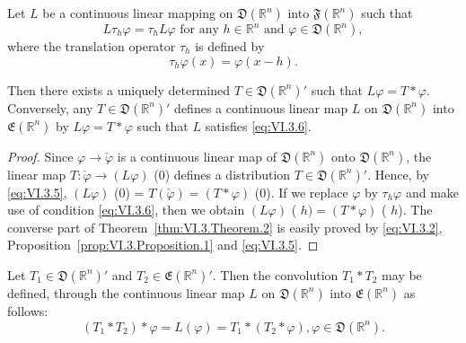 \begin{theorem}\label{thm:VI.3.Theorem.2} Let $L$ be a continuous linear mapping on $\mathfrak{D}(\mathbb{R}^{n})$ into $\mathfrak{F}(\mathbb{R}^{n})$ such that 
\begin{equation}\label{eq:VI.3.6}
L \tau_{h} \varphi = \tau_{h} L \varphi \text{ for any } h \in \mathbb{R}^{n} \text{ and } \varphi \in \mathfrak {D} (\mathbb{R}^{n}),
\end{equation}
where the translation operator $\tau_{h}$ is defined by 
\begin{equation}\label{eq:VI.3.7}
\tau_{h} \varphi (x) = \varphi (x - h).
\end{equation}
\end{theorem}

Then there exists a uniquely determined $T \in \mathfrak{D}(\mathbb{R}^{n})'$ such that $L\varphi = T * \varphi$. Conversely, any $T \in \mathfrak{D}(\mathbb{R}^{n})'$ defines a continuous linear map $L$ on $\mathfrak{D}(\mathbb{R}^{n})$ into $\mathfrak{E}(\mathbb{R}^{n})$ by $L\varphi = T * \varphi$ such that $L$ satisfies \eqref{eq:VI.3.6}. 

\begin{proof}
 Since $\varphi \to \check{\varphi}$ is a continuous linear map of $\mathfrak{D}(\mathbb{R}^{n})$ onto $\mathfrak{D}(\mathbb{R}^{n})$, the linear map $T: \check{\varphi} \to (L\varphi)$ (0) defines a distribution $T \in \mathfrak{D}(\mathbb{R}^{n})'$. Hence, by \eqref{eq:VI.3.5}, $(L\varphi)$ (0) = $T(\check{\varphi}) = (T * \varphi)$ (0). If we replace $\varphi$ by $\tau_h\varphi$ and make use of condition \eqref{eq:VI.3.6}, then we obtain $(L\varphi)$ ( $h) = (T * \varphi)$ ( $h$). The converse part of Theorem~\ref{thm:VI.3.Theorem.2} is easily proved by \eqref{eq:VI.3.2}, Proposition~\ref{prop:VI.3.Proposition.1} and \eqref{eq:VI.3.5}. 
\end{proof}

\begin{corollaryu} Let $T_{1} \in \mathfrak{D}(\mathbb{R}^{n})'$ and $T_{2} \in \mathfrak{E}(\mathbb{R}^{n})'$. Then the convolution $T_{1} * T_{2}$ may be defined, through the continuous linear map $L$ on $\mathfrak{D}(\mathbb{R}^{n})$ into $\mathfrak{E}(\mathbb{R}^{n})$ as follows: 
\begin{equation}\label{eq:VI.3.8}
\left(T _{1} * T _{2}\right) * \varphi = L (\varphi) = T _{1} * \left(T _{2} * \varphi\right), \varphi \in \mathfrak {D} \left(\mathbb{R}^{n}\right).
\end{equation}
\end{corollaryu}

